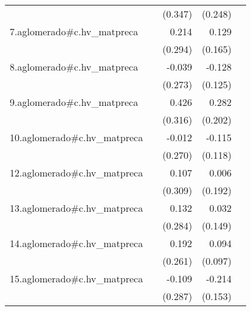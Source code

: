 {\begin{longtable}{l*{4}{D{.}{.}{-1}}}
            &                     &     (0.347)         &     (0.248)         &                     \\
\addlinespace
7.aglomerado#c.hv\_matpreca&                     &       0.214         &       0.129         &                     \\
            &                     &     (0.294)         &     (0.165)         &                     \\
\addlinespace
8.aglomerado#c.hv\_matpreca&                     &      -0.039         &      -0.128         &                     \\
            &                     &     (0.273)         &     (0.125)         &                     \\
\addlinespace
9.aglomerado#c.hv\_matpreca&                     &       0.426         &       0.282         &                     \\
            &                     &     (0.316)         &     (0.202)         &                     \\
\addlinespace
10.aglomerado#c.hv\_matpreca&                     &      -0.012         &      -0.115         &                     \\
            &                     &     (0.270)         &     (0.118)         &                     \\
\addlinespace
12.aglomerado#c.hv\_matpreca&                     &       0.107         &       0.006         &                     \\
            &                     &     (0.309)         &     (0.192)         &                     \\
\addlinespace
13.aglomerado#c.hv\_matpreca&                     &       0.132         &       0.032         &                     \\
            &                     &     (0.284)         &     (0.149)         &                     \\
\addlinespace
14.aglomerado#c.hv\_matpreca&                     &       0.192         &       0.094         &                     \\
            &                     &     (0.261)         &     (0.097)         &                     \\
\addlinespace
15.aglomerado#c.hv\_matpreca&                     &      -0.109         &      -0.214         &                     \\
            &                     &     (0.287)         &     (0.153)         &                     \\

\end{longtable}}
